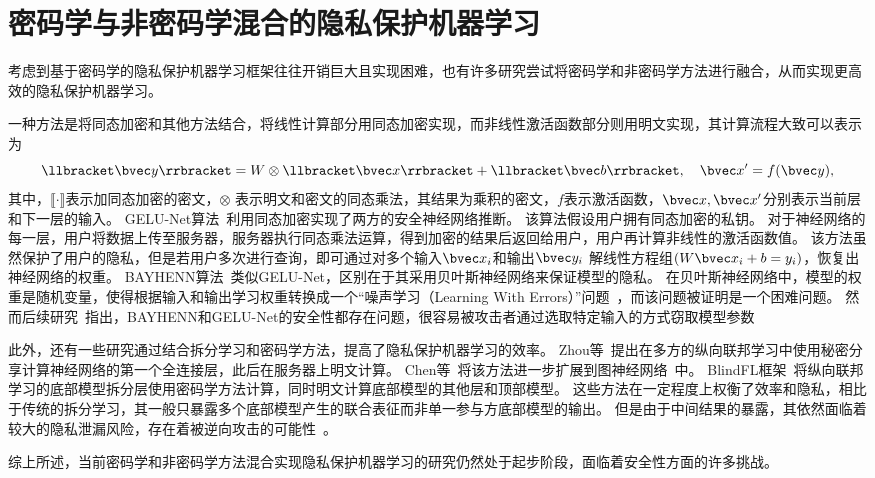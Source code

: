 \section{密码学与非密码学混合的隐私保护机器学习}
考虑到基于密码学的隐私保护机器学习框架往往开销巨大且实现困难，也有许多研究尝试将密码学和非密码学方法进行融合，从而实现更高效的隐私保护机器学习。
%

一种方法是将同态加密和其他方法结合，将线性计算部分用同态加密实现，而非线性激活函数部分则用明文实现，其计算流程大致可以表示为
\begin{equation}
    \llbracket \bvec y \rrbracket = W \otimes \llbracket \bvec x \rrbracket  + \llbracket \bvec b \rrbracket, \quad \bvec x' = f(\bvec y),
\end{equation}
其中，$\llbracket \cdot \rrbracket$表示加同态加密的密文，$\otimes$ 表示明文和密文的同态乘法，其结果为乘积的密文，$f$表示激活函数，$\bvec x, \bvec x'$分别表示当前层和下一层的输入。
%
GELU-Net算法~\cite{zhangqiao_2018_gelu_net}利用同态加密实现了两方的安全神经网络推断。
该算法假设用户拥有同态加密的私钥。
对于神经网络的每一层，用户将数据上传至服务器，服务器执行同态乘法运算，得到加密的结果后返回给用户，用户再计算非线性的激活函数值。
%
该方法虽然保护了用户的隐私，但是若用户多次进行查询，即可通过对多个输入$\bvec x_i$和输出$\bvec y_i$ 解线性方程组$(W\bvec x_i + b = y_i)$，恢复出神经网络的权重。
%
BAYHENN算法~\cite{xiepeichen_2019_bayhenn}类似GELU-Net，区别在于其采用贝叶斯神经网络来保证模型的隐私。
在贝叶斯神经网络中，模型的权重是随机变量，使得根据输入和输出学习权重转换成一个“噪声学习（Learning With Errors）”问题~\cite{regev_2010_lwe}，而该问题被证明是一个困难问题。
%
然而后续研究~\cite{wong_2020_lwe_model}指出，BAYHENN和GELU-Net的安全性都存在问题，很容易被攻击者通过选取特定输入的方式窃取模型参数

此外，还有一些研究通过结合拆分学习和密码学方法，提高了隐私保护机器学习的效率。
Zhou等~\cite{zhou_2022_codesign}提出在多方的纵向联邦学习中使用秘密分享计算神经网络的第一个全连接层，此后在服务器上明文计算。
Chen等~\cite{chen2020vertically}将该方法进一步扩展到图神经网络~\cite{defferrard_2016_gcn,hamilton_2017_graphsage,wuzonghan_2020_gnn_survey}中。
%
BlindFL框架~\cite{fu2022blindfl}将纵向联邦学习的底部模型拆分层使用密码学方法计算，同时明文计算底部模型的其他层和顶部模型。
%
这些方法在一定程度上权衡了效率和隐私，相比于传统的拆分学习，其一般只暴露多个底部模型产生的联合表征而非单一参与方底部模型的输出。
%
但是由于中间结果的暴露，其依然面临着较大的隐私泄漏风险，存在着被逆向攻击的可能性~\cite{hezecheng_2019_model_inversion_attack,abuadbba2020can_split,luoxinjian2021feature_attack,erdogan2022unsplit,qiupengyu_2023_label_selling_you_out}。

综上所述，当前密码学和非密码学方法混合实现隐私保护机器学习的研究仍然处于起步阶段，面临着安全性方面的许多挑战。
%
